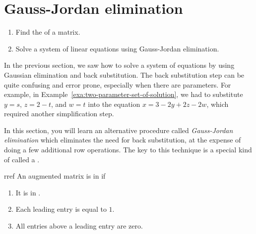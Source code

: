 \section{Gauss-Jordan elimination}

\begin{outcome}
  \begin{enumerate}
  \item Find the {\rref} of a matrix.
  \item Solve a system of linear equations using Gauss-Jordan elimination.
  \end{enumerate}
\end{outcome}

In the previous section, we saw how to solve a system of equations by
using Gaussian elimination and back substitution. The back
substitution step can be quite confusing and error prone, especially
when there are parameters. For example, in
Example~\ref{exa:two-parameter-set-of-solution}, we had to substitute $y=s$,
$z=2-t$, and $w=t$ into the equation $x=3-2y+2z-2w$, which required
another simplification step.

In this section, you will learn an alternative procedure called {\em
  Gauss-Jordan elimination} which eliminates the need for back
substitution, at the expense of doing a few additional row operations.
The key to this technique is a special kind of {\ef} called a
{\em {\rref}}.

\begin{definition}{\Rref}{rref}
  An augmented matrix is in \textbf{\rref}%
  \eindex{\rref}%
   if

  \begin{enumerate}
  \item It is in {\ef}.

  \item Each leading entry is equal to $1$.

  \item All entries above a leading entry are zero.
  \end{enumerate}
\end{definition}

